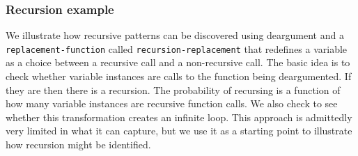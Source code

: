 \documentclass[a4paper,10pt]{article}
\begin{document}
\subsubsection{Recursion example}
We illustrate how recursive patterns can be discovered using deargument and a \texttt{replacement-function} called \texttt{recursion-replacement} that redefines a variable as a choice between a recursive call and a non-recursive call.  The basic idea is to check whether variable instances are calls to the function being deargumented.  If they are then there is a recursion.  The probability of recursing is a function of how many variable instances are recursive function calls.  We also check to see whether this transformation creates an infinite loop.  This approach is admittedly very limited in what it can capture, but we use it as a starting point to illustrate how recursion might be identified.
\end{document}
